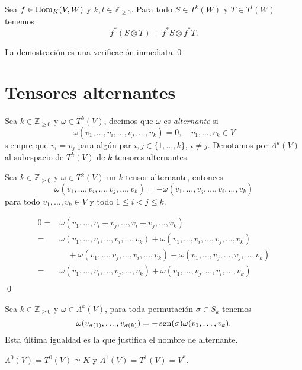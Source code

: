 \begin{prop}
Sea $f\in\operatorname{Hom}_K(V,W)$ y $k,l\in\mathbb{Z}_{\ge 0}$. Para todo $S\in T^k(W)$ y $T\in T^l(W)$ tenemos
$$f^*(S\otimes T)=f^*S\otimes f^*T.$$
\end{prop}

\dem La demostraci\'on es una verificaci\'on inmediata.\qed

\section{Tensores alternantes}

\begin{defn}
Sea $k\in\mathbb{Z}_{\ge 0}$ y $\omega\in T^k(V)$, decimos que $\omega$ es \emph{alternante} si
$$\omega(v_1,\ldots,v_i,\ldots,v_j,\ldots,v_k)=0,\quad v_1,\ldots,v_k\in V$$
siempre que $v_i=v_j$ para alg\'un par $i,j\in\{1,\ldots,k\}$, $i\ne j$. Denotamos por $\Lambda^k(V)$ al subespacio de $T^k(V)$ de $k$-tensores alternantes.  
\end{defn}

\begin{pro}
Sea $k\in\mathbb{Z}_{\ge 0}$ y $\omega\in T^k(V)$ un $k$-tensor alternante, entonces 
$$\omega(v_1,\ldots,v_i,\ldots,v_j,\ldots,v_k)=-\omega(v_1,\ldots,v_j,\ldots,v_i,\ldots,v_k)$$
para todo $v_1,\ldots,v_k\in V$ y todo $1\le i<j\le k$.
\end{pro}

\dem \begin{align*}
0 =&  \omega(v_1,\ldots,v_i+v_j,\ldots,v_i+v_j,\ldots,v_k)\\
 =& \omega(v_1,\ldots,v_i,\ldots,v_i,\ldots,v_k)+\omega(v_1,\ldots,v_i,\ldots,v_j,\ldots,v_k)\\
 & \quad +\omega(v_1,\ldots,v_j,\ldots,v_i,\ldots,v_k)+\omega(v_1,\ldots,v_j,\ldots,v_j,\ldots,v_k)\\
 = &\omega(v_1,\ldots,v_i,\ldots,v_j,\ldots,v_k)+\omega(v_1,\ldots,v_j,\ldots,v_i,\ldots,v_k)\\
\end{align*}\qed

\begin{obs}
Sea $k\in\mathbb{Z}_{\ge 0}$ y $\omega\in \Lambda^k(V)$, para toda permutaci\'on $\sigma\in S_k$ tenemos
$$\omega(v_{\sigma(1)},\ldots,v_{\sigma(k)})=-\operatorname{sgn}(\sigma)\omega(v_1,\ldots,v_k).$$
Esta \'ultima igualdad es la que justifica el nombre de alternante.
\end{obs}

\begin{obs}
$\Lambda^0(V)=T^0(V)\simeq K$ y $\Lambda^1(V)=T^1(V)=V^*$.
\end{obs}

